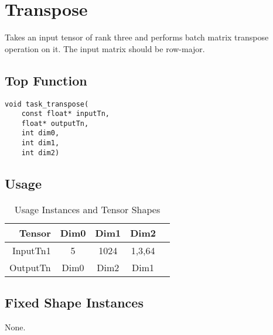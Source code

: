 \clearpage









\section{Transpose}
Takes an input tensor of rank three and performs batch matrix transpose operation on it. The input matrix should be row-major.

\subsection{Top Function}
\begin{lstlisting}
void task_transpose(
	const float* inputTn,
	float* outputTn,
	int dim0,
	int dim1,
	int dim2)
\end{lstlisting}

\subsection{Usage}
\begin{table}[htbp] %
\caption{Usage Instances and Tensor Shapes}
\label{tab:shapes_transpose}
	\begin{center}
		\begin{tabular}{|r|c|c|c|c|} 
		\hline	
		Tensor & Dim0 & Dim1 & Dim2\\ 
		\hline	
		InputTn1 &
			5 &
			1024 &
			1,3,64\\ 
		\hline
		OutputTn &
			Dim0 & 
			Dim2 & 
			Dim1 \\
		\hline
		\end{tabular}
	\end{center}
\end{table}

\subsection{Fixed Shape Instances}
None.

